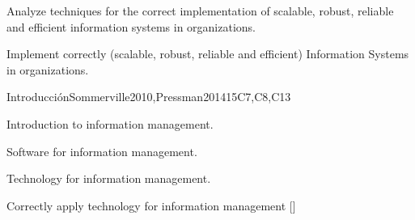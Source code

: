 \begin{syllabus}


\begin{justification}
Analyze techniques for the correct implementation of scalable, robust, reliable and efficient information systems in organizations.
\end{justification}

\begin{goals}
\item Implement correctly (scalable, robust, reliable and efficient) Information Systems in organizations.
\end{goals}

\begin{outcomes}
    \item {}
    \item {}
    \item {}
\end{outcomes}

\begin{competences}
    \item {} 
    \item {} 
    \item {} 
    \item {} 
    \item {} 
    \item {} 
    \item {} 
\end{competences}

\begin{unit}{Introducción}{}{Sommerville2010,Pressman2014}{15}{C7,C8,C13}
\begin{topics}
    \item Introduction to information management.
    \item Software for information management.
    \item Technology for information management.
\end{topics}
\begin{learningoutcomes}
    \item Correctly apply technology for information management [\Assessment]
\end{learningoutcomes}
\end{unit}


\end{syllabus}
